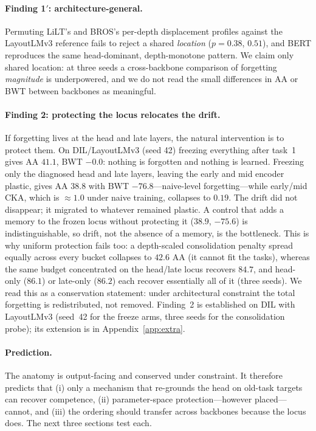 \documentclass{article}
\begin{document}
\paragraph{Finding 1$'$: architecture-general.} Permuting LiLT's and BROS's per-depth displacement profiles against the LayoutLMv3 reference fails to reject a shared \emph{location} ($p=0.38$, $0.51$), and BERT reproduces the same head-dominant, depth-monotone pattern. We claim only shared location: at three seeds a cross-backbone comparison of forgetting \emph{magnitude} is underpowered, and we do not read the small differences in AA or BWT between backbones as meaningful.

\paragraph{Finding 2: protecting the locus relocates the drift.} If forgetting lives at the head and late layers, the natural intervention is to protect them. On DIL/LayoutLMv3 (seed 42) freezing everything after task~1 gives AA $41.1$, BWT $-0.0$: nothing is forgotten and nothing is learned. Freezing only the diagnosed head and late layers, leaving the early and mid encoder plastic, gives AA $38.8$ with BWT $-76.8$---naive-level forgetting---while early/mid CKA, which is $\approx1.0$ under naive training, collapses to $0.19$. The drift did not disappear; it migrated to whatever remained plastic. A control that adds a memory to the frozen locus without protecting it ($38.9$, $-75.6$) is indistinguishable, so drift, not the absence of a memory, is the bottleneck. This is why uniform protection fails too: a depth-scaled consolidation penalty spread equally across every bucket collapses to $42.6$ AA (it cannot fit the tasks), whereas the same budget concentrated on the head/late locus recovers $84.7$, and head-only ($86.1$) or late-only ($86.2$) each recover essentially all of it (three seeds). We read this as a conservation statement: under architectural constraint the total forgetting is redistributed, not removed. Finding~2 is established on DIL with LayoutLMv3 (seed~42 for the freeze arms, three seeds for the consolidation probe); its extension is in Appendix~\ref{app:extra}.

\paragraph{Prediction.} The anatomy is output-facing and conserved under constraint. It therefore predicts that (i) only a mechanism that re-grounds the head on old-task targets can recover competence, (ii) parameter-space protection---however placed---cannot, and (iii) the ordering should transfer across backbones because the locus does. The next three sections test each.
\end{document}
